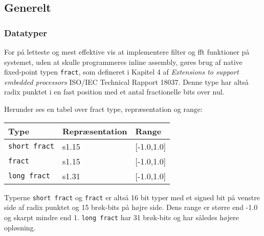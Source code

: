 \subsection{Generelt}

\subsubsection{Datatyper}
For på letteste og mest effektive vis at implementere filter og fft funktioner på systemet, uden at skulle programmeres inline assembly, gøres brug af native fixed-point typen \verb+fract+, som defineret i Kapitel 4 af \textit{Extensions to support embedded processors} ISO/IEC Technical Rapport 18037. 
Denne type har altså radix punktet i en fast position med et antal fractionelle bits over nul. 

Herunder ses en tabel over fract type, repræsentation og range:

\begin{center}
    \begin{tabular}{ | p{} | p{} | p{} |}
    \hline
    \textbf{Type}				& \textbf{Repræsentation}	& \textbf{Range}	\\ \hline
    \verb+short fract+ 			& s1.15						& [-1.0,1.0]		\\ \hline
    \verb+fract+ 				& s1.15						& [-1.0,1.0]		\\ \hline
    \verb+long fract+ 			& s1.31						& [-1.0,1.0]		\\ \hline
    \end{tabular}
\end{center}

Typerne \verb+short fract+ og \verb+fract+ er altså 16 bit typer med et signed bit på venstre side af radix punktet og 15 brøk-bits på højre side. Dens range er større end -1.0 og skarpt mindre end 1. \verb+long fract+ har 31 brøk-bits og har således højere opløsning.
